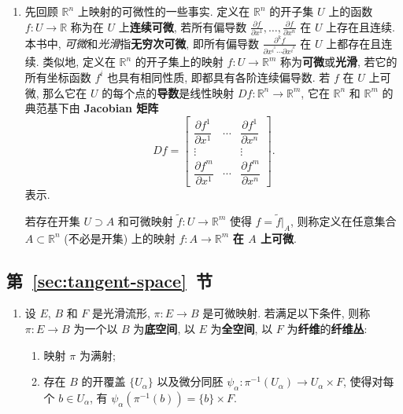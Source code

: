 \begin{enumerate}[label=(\arabic*),leftmargin=*]
\item 先回顾 $\mathbb{R}^n$ 上映射的可微性的一些事实. 定义在 $\mathbb{R}^n$ 的开子集 $U$ 上的函数 $f:U\to\mathbb{R}$ 称为在 $U$ 上\textbf{连续可微}, 若所有偏导数 $\frac{\partial f}{\partial x^1},\ldots,\frac{\partial f}{\partial x^n}$ 在 $U$ 上存在且连续. 本书中, \emph{可微}和\emph{光滑}指\textbf{无穷次可微}, 即所有偏导数 $\frac{\partial^k f}{\partial x^{i^1}\cdots\partial x^{i^k}}$ 在 $U$ 上都存在且连续. 类似地, 定义在 $\mathbb{R}^n$ 的开子集上的映射 $f:U\to\mathbb{R}^m$ 称为\textbf{可微}或\textbf{光滑}, 若它的所有坐标函数 $f^i$ 也具有相同性质, 即都具有各阶连续偏导数. 若 $f$ 在 $U$ 上可微, 那么它在 $U$ 的每个点的\textbf{导数}是线性映射 $Df:\mathbb{R}^n\to\mathbb{R}^m$, 它在 $\mathbb{R}^n$ 和 $\mathbb{R}^m$ 的典范基下由 \textbf{Jacobian 矩阵}
\[
  Df=\begin{bmatrix}
    \dfrac{\partial f^1}{\partial x^1}&\cdots&\dfrac{\partial f^1}{\partial x^n}\\
    \vdots&&\vdots\\
    \dfrac{\partial f^m}{\partial x^1}&\cdots&\dfrac{\partial f^m}{\partial x^n}
  \end{bmatrix}.
\]
表示.

若存在开集 $U\supset A$ 和可微映射 $\widetilde f:U\to\mathbb{R}^m$ 使得 $f=\widetilde f|_A$, 则称定义在任意集合 $A\subset\mathbb{R}^n$ (不必是开集) 上的映射 $f:A\to\mathbb{R}^m$ \textbf{在 $A$ 上可微}.
\end{enumerate}

\subsection[第 \ref{sec:tangent-space} 节]{第~\ref{sec:tangent-space}~节}\label{subsec:notes-tangent-space}

\begin{enumerate}[label=(\arabic*),leftmargin=*]
\item 设 $E$, $B$ 和 $F$ 是光滑流形, $\pi:E\to B$ 是可微映射. 若满足以下条件, 则称 $\pi:E\to B$ 为一个以 $B$ 为\textbf{底空间}, 以 $E$ 为\textbf{全空间}, 以 $F$ 为\textbf{纤维}的\textbf{纤维丛}:
\begin{enumerate}[label=(\roman*),leftmargin=*]
\item 映射 $\pi$ 为满射;
\item 存在 $B$ 的开覆盖 $\{U_\alpha\}$ 以及微分同胚 $\psi_\alpha:\pi^{-1}(U_\alpha)\to U_\alpha\times F$, 使得对每个 $b\in U_\alpha$, 有 $\psi_\alpha(\pi^{-1}(b))=\{b\}\times F$.
\end{enumerate}
\end{enumerate}

